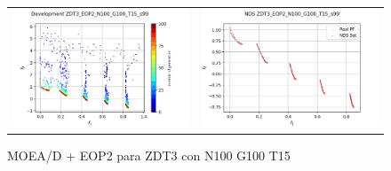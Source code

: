 \begin{figure}[H]
\begin{tabular}{c c}
    \includegraphics[scale=0.45]{figures/ZDT3_EOP2_N100_G100_T15/s99_dev.png} &
    \includegraphics[scale=0.45]{figures/ZDT3_EOP2_N100_G100_T15/s99_nds.png}\\
    \end{tabular}
    \caption{MOEA/D + EOP2 para ZDT3 con N100 G100 T15 }
    \label{fig:2}
\end{figure}

